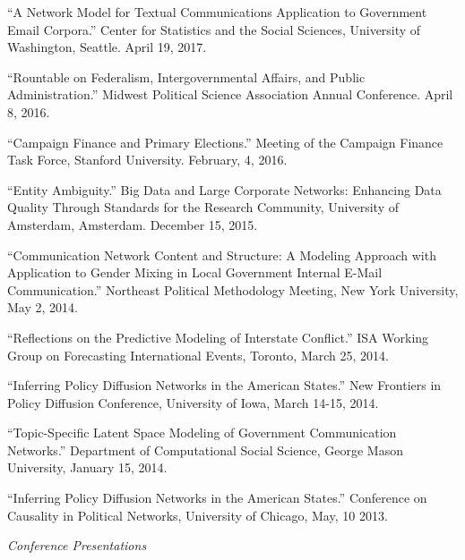 \documentclass[overlapped,line]{res}
\begin{document}
\begin{resume}
\begin{etaremune}
\item ``A Network Model for Textual Communications Application to Government Email Corpora.'' Center for Statistics and the Social Sciences, University of Washington, Seattle. April 19, 2017.
\item ``Rountable on Federalism, Intergovernmental Affairs, and Public Administration.'' Midwest Political Science Association Annual Conference. April 8, 2016. 
\item ``Campaign Finance and Primary Elections.'' Meeting of the Campaign Finance Task Force, Stanford University. February, 4, 2016.
\item ``Entity Ambiguity.'' Big Data and Large Corporate Networks: Enhancing Data Quality Through Standards for the Research Community, University of Amsterdam, Amsterdam. December 15, 2015. 
\item ``Communication Network Content and Structure: A Modeling Approach with Application to Gender Mixing in Local Government Internal E-Mail Communication.'' Northeast Political Methodology Meeting, New York University, May 2, 2014.
\item ``Reflections on the Predictive Modeling of Interstate Conflict.'' ISA Working Group on Forecasting International Events, Toronto, March 25, 2014.
\item ``Inferring Policy Diffusion Networks in the American States.'' New Frontiers in Policy Diffusion Conference, University of  Iowa,  March 14-15, 2014.
\item  ``Topic-Specific Latent Space Modeling of Government Communication Networks.'' Department of Computational Social Science, George Mason University, January 15, 2014.
\item ``Inferring Policy Diffusion Networks in the American States.'' Conference on Causality in Political Networks, University of Chicago, May, 10 2013.
\end{etaremune}

\hspace{-1cm} \emph{Conference Presentations}
\begin{etaremune}


\end{etaremune}
\end{resume}
\end{document}
